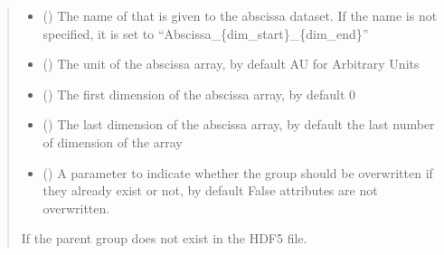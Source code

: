 \documentclass[letterpaper,10pt,english]{sphinxmanual}
\begin{document}
\begin{fulllineitems}
\begin{fulllineitems}
\begin{quote}
\begin{description}
\begin{itemize}
\item {} 
\sphinxAtStartPar
{} (\sphinxstyleliteralemphasis{\sphinxupquote{, }}) \textendash{} The name of that is given to the abscissa dataset. If the name is not specified, it is set to “Abscissa\_\{dim\_start\}\_\{dim\_end\}”

\item {} 
\sphinxAtStartPar
{} (\sphinxstyleliteralemphasis{\sphinxupquote{, }}) \textendash{} The unit of the abscissa array, by default AU for Arbitrary Units

\item {} 
\sphinxAtStartPar
{} (\sphinxstyleliteralemphasis{\sphinxupquote{, }}) \textendash{} The first dimension of the abscissa array, by default 0

\item {} 
\sphinxAtStartPar
{} (\sphinxstyleliteralemphasis{\sphinxupquote{, }}) \textendash{} The last dimension of the abscissa array, by default the last number of dimension of the array

\item {} 
\sphinxAtStartPar
{} (\sphinxstyleliteralemphasis{\sphinxupquote{, }}) \textendash{} A parameter to indicate whether the group should be overwritten if they already exist or not, by default False \sphinxhyphen{} attributes are not overwritten.

\end{itemize}

\sphinxAtStartPar
{} \textendash{} If the parent group does not exist in the HDF5 file.

\end{description}\end{quote}


\end{fulllineitems}
\end{fulllineitems}
\end{document}
